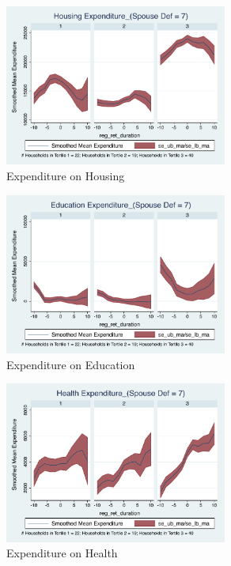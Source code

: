 \documentclass[11pt,onecolumn]{article}
\numberwithin{figure}{section}
\begin{document}
\clearpage

\begin{figure}[h]
	\caption{Expenditure on Housing}
	\centering
	\includegraphics[width=0.65\textwidth]{../ConsumptionPostRetirement_by_SpouseDef_Cats/Smoothed/7/spouse_def_total_housing_real.pdf}
\end{figure}


\begin{figure}[h]
	\caption{Expenditure on Education}
	\centering
	\includegraphics[width=0.65\textwidth]{../ConsumptionPostRetirement_by_SpouseDef_Cats/Smoothed/7/spouse_def_total_education_real.pdf}
\end{figure}
\clearpage

\begin{figure}[h]
	\caption{Expenditure on Health}
	\centering
	\includegraphics[width=0.65\textwidth]{../ConsumptionPostRetirement_by_SpouseDef_Cats/Smoothed/7/spouse_def_total_healthexpense_real.pdf}
\end{figure}
\end{document}

